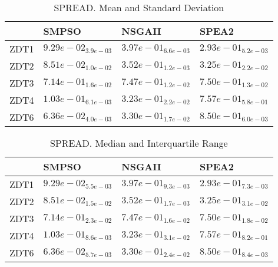 \documentclass{article}
\begin{document}
\begin{table}
\caption{SPREAD. Mean and Standard Deviation}
\label{table: SPREAD}
\centering
\begin{scriptsize}
\begin{tabular}{llll}
\hline & SMPSO & NSGAII &  SPEA2\\
\hline 
ZDT1 & \cellcolor{gray95}$  9.29e-02_{ 3.9e-03}$ & $  3.97e-01_{ 6.6e-03}$ & \cellcolor{gray25}$  2.93e-01_{ 5.2e-03}$ \\
ZDT2 & \cellcolor{gray95}$  8.51e-02_{ 1.0e-02}$ & $  3.52e-01_{ 1.2e-03}$ & \cellcolor{gray25}$  3.25e-01_{ 2.2e-02}$ \\
ZDT3 & \cellcolor{gray95}$  7.14e-01_{ 1.6e-02}$ & \cellcolor{gray25}$  7.47e-01_{ 1.2e-02}$ & $  7.50e-01_{ 1.3e-02}$ \\
ZDT4 & \cellcolor{gray95}$  1.03e-01_{ 6.1e-03}$ & \cellcolor{gray25}$  3.23e-01_{ 2.2e-02}$ & $  7.57e-01_{ 5.8e-01}$ \\
ZDT6 & \cellcolor{gray95}$  6.36e-02_{ 4.0e-03}$ & \cellcolor{gray25}$  3.30e-01_{ 1.7e-02}$ & $  8.50e-01_{ 6.0e-03}$ \\
\hline
\end{tabular}
\end{scriptsize}
\end{table}

\begin{table}
\caption{SPREAD. Median and Interquartile Range}
\label{table: SPREAD}
\centering
\begin{scriptsize}
\begin{tabular}{llll}
\hline & SMPSO & NSGAII &  SPEA2\\
\hline 
ZDT1 & \cellcolor{gray95}$  9.29e-02_{ 5.5e-03}$ & $  3.97e-01_{ 9.3e-03}$ & \cellcolor{gray25}$  2.93e-01_{ 7.3e-03}$ \\
ZDT2 & \cellcolor{gray95}$  8.51e-02_{ 1.5e-02}$ & $  3.52e-01_{ 1.7e-03}$ & \cellcolor{gray25}$  3.25e-01_{ 3.1e-02}$ \\
ZDT3 & \cellcolor{gray95}$  7.14e-01_{ 2.3e-02}$ & \cellcolor{gray25}$  7.47e-01_{ 1.6e-02}$ & $  7.50e-01_{ 1.8e-02}$ \\
ZDT4 & \cellcolor{gray95}$  1.03e-01_{ 8.6e-03}$ & \cellcolor{gray25}$  3.23e-01_{ 3.1e-02}$ & $  7.57e-01_{ 8.2e-01}$ \\
ZDT6 & \cellcolor{gray95}$  6.36e-02_{ 5.7e-03}$ & \cellcolor{gray25}$  3.30e-01_{ 2.4e-02}$ & $  8.50e-01_{ 8.4e-03}$ \\
\hline
\end{tabular}
\end{scriptsize}
\end{table}
\end{document}
